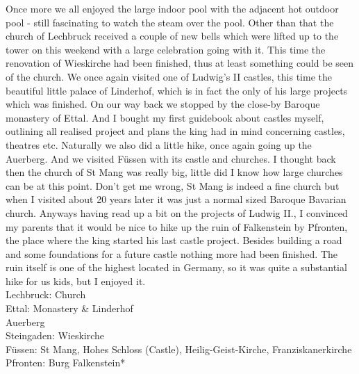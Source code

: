 Once more we all enjoyed the large indoor pool with the adjacent hot outdoor pool - still fascinating to watch the steam over the pool. Other than that the church of Lechbruck received a couple of new bells which were lifted up to the tower on this weekend with a large celebration going with it. This time the renovation of Wieskirche had been finished, thus at least something could be seen of the church. We once again visited one of Ludwig's II castles, this time the beautiful little palace of Linderhof, which is in fact the only of his large projects which was finished. On our way back we stopped by the close-by Baroque monastery of Ettal. And I bought my first guidebook about castles myself, outlining all realised project and plans the king had in mind concerning castles, theatres etc. Naturally we also did a little hike, once again going up the Auerberg. And we visited F\"ussen with its castle and churches. I thought back then the church of St Mang was really big, little did I know how large churches can be at this point. Don't get me wrong, St Mang is indeed a fine church but when I visited about 20 years later it was just a normal sized Baroque Bavarian church. Anyways having read up a bit on the projects of Ludwig II., I convinced my parents that it would be nice to hike up the ruin of Falkenstein by Pfronten, the place where the king started his last castle project. Besides building a road and some foundations for a future castle nothing more had been finished. The ruin itself is one of the highest located in Germany, so it was quite a substantial hike for us kids, but I enjoyed it.\\

Lechbruck: Church\\
Ettal: Monastery \& Linderhof\\
Auerberg\\
Steingaden: Wieskirche\\
F\"ussen: St Mang, Hohes Schloss (Castle), Heilig-Geist-Kirche, Franziskanerkirche\\
Pfronten: Burg Falkenstein*\\

